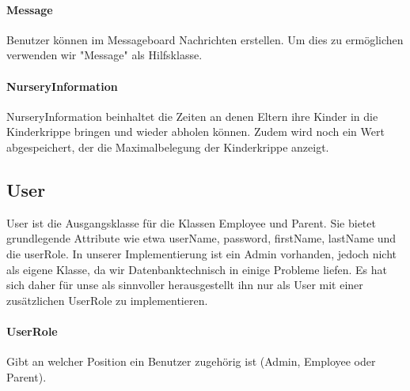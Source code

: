 \paragraph{Message}
	Benutzer können im Messageboard Nachrichten erstellen. Um dies zu ermöglichen verwenden wir "Message" als Hilfsklasse. 
\paragraph{NurseryInformation}
	NurseryInformation beinhaltet die Zeiten an denen Eltern ihre Kinder in die Kinderkrippe bringen und wieder abholen können. Zudem wird noch ein Wert abgespeichert, der die Maximalbelegung der Kinderkrippe anzeigt. 
	
\subsection{User}
User ist die Ausgangsklasse für die Klassen Employee und Parent. Sie bietet grundlegende Attribute wie etwa userName, password, firstName, lastName und die userRole. 
In unserer Implementierung ist ein Admin vorhanden, jedoch nicht als eigene Klasse, da wir Datenbanktechnisch in einige Probleme liefen. Es hat sich daher für unse als sinnvoller herausgestellt ihn nur als User mit einer zusätzlichen UserRole zu implementieren. 
\paragraph{UserRole}
Gibt an welcher Position ein Benutzer zugehörig ist (Admin, Employee oder Parent). 
